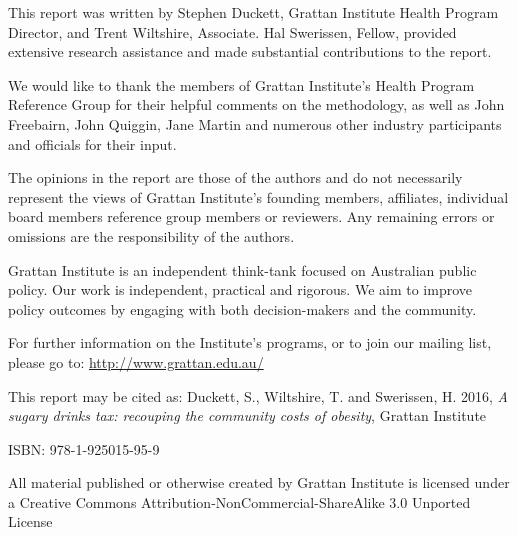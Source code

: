 This report was written by Stephen Duckett, Grattan Institute Health Program Director, and Trent Wiltshire, Associate. Hal Swerissen, Fellow, provided extensive research assistance and made substantial contributions to the report.

We would like to thank the members of Grattan Institute's Health Program Reference Group for their helpful comments on the methodology, as well as John Freebairn, John Quiggin, Jane Martin and numerous other industry participants and officials for their input.

The opinions in the report are those of the authors and do not necessarily represent the views of Grattan Institute’s founding members, affiliates, individual board members reference group members or reviewers. Any remaining errors or omissions are the responsibility of the authors.

Grattan Institute is an independent think-tank focused on Australian public policy. Our work is independent, practical and rigorous. We aim to improve policy outcomes by engaging with both decision-makers and the community.

For further information on the Institute's programs, or to join our mailing list, please go to:
\url{http://www.grattan.edu.au/}

{\small
This report may be cited as:
\newline
Duckett, S., Wiltshire, T. and Swerissen, H. 2016, \emph{\mytitle A sugary drinks tax: recouping the community costs of obesity}, Grattan Institute

ISBN: 978-1-925015-95-9

All material published or otherwise created by Grattan Institute is licensed under a Creative Commons Attribution-NonCommercial-ShareAlike 3.0 Unported License 
}